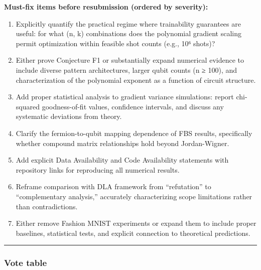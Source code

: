 \documentclass[10pt,letterpaper]{article}
\begin{document}
\textbf{Must-fix items before resubmission (ordered by severity):}

\begin{enumerate}
\def\labelenumi{\arabic{enumi}.}
\item
  Explicitly quantify the practical regime where trainability guarantees are useful: for what (n, k) combinations does the polynomial gradient scaling permit optimization within feasible shot counts (e.g., 10⁶ shots)?
\item
  Either prove Conjecture F1 or substantially expand numerical evidence to include diverse pattern architectures, larger qubit counts (n ≥ 100), and characterization of the polynomial exponent as a function of circuit structure.
\item
  Add proper statistical analysis to gradient variance simulations: report chi-squared goodness-of-fit values, confidence intervals, and discuss any systematic deviations from theory.
\item
  Clarify the fermion-to-qubit mapping dependence of FBS results, specifically whether compound matrix relationships hold beyond Jordan-Wigner.
\item
  Add explicit Data Availability and Code Availability statements with repository links for reproducing all numerical results.
\item
  Reframe comparison with DLA framework from ``refutation'' to ``complementary analysis,'' accurately characterizing scope limitations rather than contradictions.
\item
  Either remove Fashion MNIST experiments or expand them to include proper baselines, statistical tests, and explicit connection to theoretical predictions.
\end{enumerate}

\begin{center}\rule{0.5\linewidth}{0.5pt}\end{center}

\hypertarget{vote-table}{%
\subsubsection{Vote table}\label{vote-table}}
\end{document}

